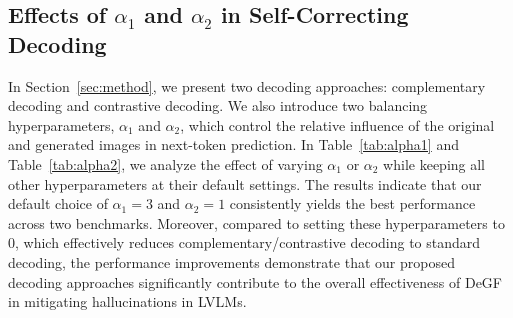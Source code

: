 \subsection{Effects of \texorpdfstring{$\alpha_1$ and $\alpha_2$}{alpha1 and alpha2} in Self-Correcting Decoding}
In Section~\ref{sec:method}, we present two decoding approaches: complementary decoding and contrastive decoding. We also introduce two balancing hyperparameters, $\alpha_1$ and $\alpha_2$, which control the relative influence of the original and generated images in next-token prediction.
In Table~\ref{tab:alpha1} and Table~\ref{tab:alpha2}, we analyze the effect of varying $\alpha_1$ or $\alpha_2$ while keeping all other hyperparameters at their default settings. The results indicate that our default choice of $\alpha_1=3$ and $\alpha_2=1$ consistently yields the best performance across two benchmarks. Moreover, compared to setting these hyperparameters to 0, which effectively reduces complementary/contrastive decoding to standard decoding, the performance improvements demonstrate that our proposed decoding approaches significantly contribute to the overall effectiveness of DeGF in mitigating hallucinations in LVLMs.



\begin{table}[t]
\centering
\caption{\textbf{Sensitivity analysis of hyperparameter $\alpha_1$}. We present the performance of our approach, based on the LLaVA-1.5 backbone, across two benchmarks for varying values of $\alpha_1$. Note that we fix $\alpha_2=1$ in this experiment.}
    \label{tab:alpha1}
\end{table}


